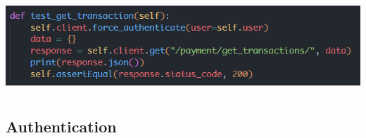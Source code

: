 \documentclass[11pt]{article}
\begin{document}
\begin{center}
    \includegraphics[scale=0.8]{unit_testing_codes/transaction_history.png}
\end{center}

\newpage
\section{}

\subsection{Authentication}
\end{document}
